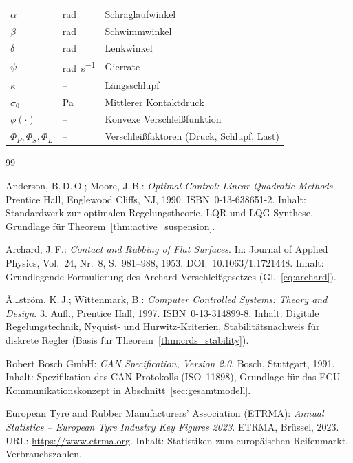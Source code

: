 ﻿\documentclass[12pt,a4paper]{article}
\theoremstyle{definition}
\theoremstyle{remark}
\begin{document}
\begin{longtable}{lll}
$\alpha$ & \si{\radian} & Schräglaufwinkel\\
$\beta$ & \si{\radian} & Schwimmwinkel\\
$\delta$ & \si{\radian} & Lenkwinkel\\
$\dot\psi$ & \si{\radian\per\second} & Gierrate\\
$\kappa$ & -- & Längsschlupf\\
$\sigma_0$ & \si{\pascal} & Mittlerer Kontaktdruck\\
$\phi(\cdot)$ & -- & Konvexe Verschleißfunktion\\
$\Phi_P, \Phi_S, \Phi_L$ & -- & Verschleißfaktoren (Druck, Schlupf, Last)\\
\bottomrule
\end{longtable}

\begin{thebibliography}{99}

Anderson, B.\,D.\,O.; Moore, J.\,B.: \textit{Optimal Control: Linear Quadratic Methods}.
Prentice Hall, Englewood Cliffs, NJ, 1990.
ISBN~0-13-638651-2.
Inhalt: Standardwerk zur optimalen Regelungstheorie, LQR und LQG-Synthese.
Grundlage für Theorem~\ref{thm:active_suspension}.

Archard, J.\,F.: \textit{Contact and Rubbing of Flat Surfaces}.
In: Journal of Applied Physics, Vol.~24, Nr.~8, S.~981--988, 1953.
DOI:~10.1063/1.1721448.
Inhalt: Grundlegende Formulierung des Archard-Verschleißgesetzes (Gl.~\ref{eq:archard}).

Ã…ström, K.\,J.; Wittenmark, B.: \textit{Computer Controlled Systems: Theory and Design}.
3. Aufl., Prentice Hall, 1997.
ISBN~0-13-314899-8.
Inhalt: Digitale Regelungstechnik, Nyquist- und Hurwitz-Kriterien, Stabilitätsnachweis
für diskrete Regler (Basis für Theorem~\ref{thm:crds_stability}).

Robert Bosch GmbH: \textit{CAN Specification, Version 2.0}.
Bosch, Stuttgart, 1991.
Inhalt: Spezifikation des CAN-Protokolls (ISO~11898), Grundlage für das
ECU-Kommunikationskonzept in Abschnitt~\ref{sec:gesamtmodell}.

European Tyre and Rubber Manufacturers' Association (ETRMA):
\textit{Annual Statistics -- European Tyre Industry Key Figures 2023}.
ETRMA, Brüssel, 2023. URL: \url{https://www.etrma.org}.
Inhalt: Statistiken zum europäischen Reifenmarkt, Verbrauchszahlen.


\end{thebibliography}
\end{document}
